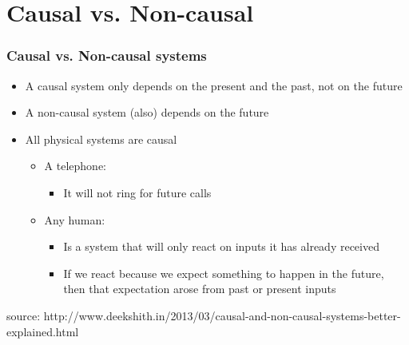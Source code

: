 \documentclass{beamer}
\begin{document}
	\section{Causal vs. Non-causal} 
	
	\begin{frame}
		\frametitle{Causal vs. Non-causal systems}
		\begin{itemize}
			\item \normalsize{A causal system only depends on the present and the past, not on the future}
			\item \normalsize{A non-causal system (also) depends on the future}
			\item \normalsize{All physical systems are causal}
			\begin{itemize}
				\item \normalsize{A telephone:}
				\begin{itemize}
					\item \normalsize{It will not ring for future calls}
				\end{itemize}
				\item \normalsize{Any human:} 
				\begin{itemize}
					\item \normalsize{Is a system that will only react on inputs it has already received}
					\item \normalsize{If we react because we expect something to happen in the future, then that expectation arose from past or present inputs}
				\end{itemize}
			\end{itemize}
		\end{itemize}
		\bigskip
		\footnotesize{source: http://www.deekshith.in/2013/03/causal-and-non-causal-systems-better-explained.html}
	\end{frame}
	
	
\end{document}

